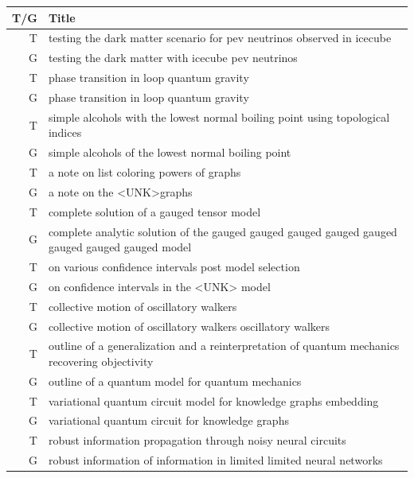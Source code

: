 \documentclass{article}
\begin{document}
\begin{center}
    \begin{longtable}{r|p{15cm}}
        \toprule
        T/G & Title  \\
        \hline
        \endhead
        \midrule
        T & testing the dark matter scenario for pev neutrinos observed in icecube \\
        G & testing the dark matter with icecube pev neutrinos\\
        \hline
        T & phase transition in loop quantum gravity \\
        G & phase transition in loop quantum gravity\\
        \hline
        T & simple alcohols with the lowest normal boiling point using topological indices \\
        G & simple alcohols of the lowest normal boiling point \\
        \hline
        T & a note on list coloring powers of graphs \\
        G & a note on the \textless UNK\textgreater  graphs\\
        \hline
        T & complete solution of a gauged tensor model \\
        G & complete analytic solution of the gauged gauged gauged gauged gauged gauged gauged gauged model\\
        \hline
        T & on various confidence intervals post model selection \\
        G & on confidence intervals in the <UNK> model\\
        \hline
        T & collective motion of oscillatory walkers \\
        G & collective motion of oscillatory walkers oscillatory walkers\\
        \hline
        T & outline of a generalization and a reinterpretation of quantum mechanics recovering objectivity \\
        G & outline of a quantum model for quantum mechanics\\
        \hline
        T & variational quantum circuit model for knowledge graphs embedding \\
        G & variational quantum circuit for knowledge graphs\\
        \hline
        T & robust information propagation through noisy neural circuits \\
        G & robust information of information in limited limited neural networks\\

\end{longtable}
\end{center}
\end{document}
